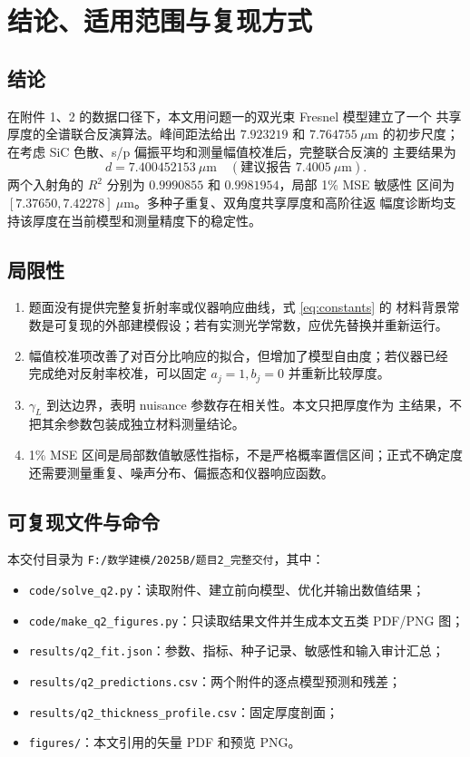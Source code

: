\documentclass[UTF8,12pt,a4paper]{ctexart}
\begin{document}
\section{结论、适用范围与复现方式}

\subsection{结论}

在附件 1、2 的数据口径下，本文用问题一的双光束 Fresnel 模型建立了一个
共享厚度的全谱联合反演算法。峰间距法给出 $7.923219$ 和 $7.764755\ \mu$m
的初步尺度；在考虑 SiC 色散、s/p 偏振平均和测量幅值校准后，完整联合反演的
主要结果为
\[
\boxed{d=7.400452153\ \mu\mathrm{m}\quad (\text{建议报告 }7.4005\ \mu\mathrm{m})}.
\]
两个入射角的 $R^2$ 分别为 $0.9990855$ 和 $0.9981954$，局部 1\% MSE 敏感性
区间为 $[7.37650,7.42278]\ \mu$m。多种子重复、双角度共享厚度和高阶往返
幅度诊断均支持该厚度在当前模型和测量精度下的稳定性。

\subsection{局限性}

\begin{enumerate}[leftmargin=5em]
  \item 题面没有提供完整复折射率或仪器响应曲线，式 \eqref{eq:constants} 的
  材料背景常数是可复现的外部建模假设；若有实测光学常数，应优先替换并重新运行。
  \item 幅值校准项改善了对百分比响应的拟合，但增加了模型自由度；若仪器已经
  完成绝对反射率校准，可以固定 $a_j=1,b_j=0$ 并重新比较厚度。
  \item $\gamma_L$ 到达边界，表明 nuisance 参数存在相关性。本文只把厚度作为
  主结果，不把其余参数包装成独立材料测量结论。
  \item 1\% MSE 区间是局部数值敏感性指标，不是严格概率置信区间；正式不确定度
  还需要测量重复、噪声分布、偏振态和仪器响应函数。
\end{enumerate}

\subsection{可复现文件与命令}

本交付目录为
\verb|F:/数学建模/2025B/题目2_完整交付|，其中：
\begin{itemize}[leftmargin=5em]
  \item \verb|code/solve_q2.py|：读取附件、建立前向模型、优化并输出数值结果；
  \item \verb|code/make_q2_figures.py|：只读取结果文件并生成本文五类 PDF/PNG 图；
  \item \verb|results/q2_fit.json|：参数、指标、种子记录、敏感性和输入审计汇总；
  \item \verb|results/q2_predictions.csv|：两个附件的逐点模型预测和残差；
  \item \verb|results/q2_thickness_profile.csv|：固定厚度剖面；
  \item \verb|figures/|：本文引用的矢量 PDF 和预览 PNG。
\end{itemize}
\end{document}

